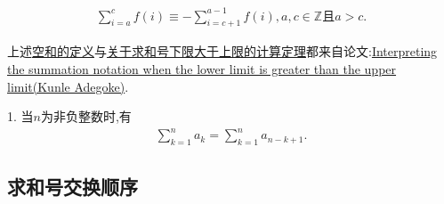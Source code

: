 \documentclass[lang=cn,newtx,10pt,scheme=chinese]{elegantbook}
\begin{document}
\begin{theorem}[关于求和号下限大于上限的计算]\label{theorem:关于求和号下限大于上限的计算}
   \begin{align}
     \sum\limits_{i=a}^c{f(i)}\equiv -\sum\limits_{i=c+1}^{a-1}{f(i),a,c}\in \mathbb{Z}\text{且} a>c. 
   \end{align}
\end{theorem}
\begin{note}
   上述\hyperref[definition:空和(Empty sum)]{空和的定义}与\hyperref[theorem:关于求和号下限大于上限的计算]{关于求和号下限大于上限的计算定理}都来自论文:\href{https://vixra.org/pdf/1601.0207v1.pdf}{Interpreting the summation notation when
   the lower limit is greater than the upper limit(Kunle Adegoke)}.
\end{note}

\begin{theorem}[求和号基本性质]\label{theorem:求和号基本性质}
   1. 当$n$为非负整数时,有
   \begin{align*}
      \sum\limits_{k=1}^n{a_k}=\sum\limits_{k=1}^n{a_{n-k+1}}.
   \end{align*}
\end{theorem}

\subsection{求和号交换顺序}
\end{document}
